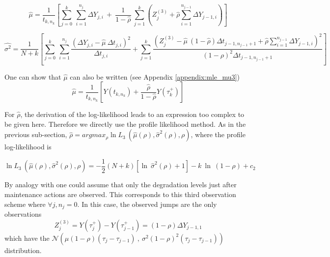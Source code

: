 \begin{equation}
\hat{\mu} = \frac{1}{t_{k,n_{k}}} \left[ \sum\limits_{j=0}^{k}\ \sum\limits_{i=1}^{n_j}\Delta Y_{j,i}\ +\ \frac{1}{1-\hat{\rho}}\ \sum\limits_{j=1}^{k} \left(Z_j^{(3)}+\hat{\rho} \sum \limits_{i=1}^{n_{j-1}}\Delta Y_{j-1,i}\right)\right]
\label{eq:mle_mu3}
\end{equation}


\begin{equation}
\hat{\sigma^2} =\frac{1}{N+k} \left[\sum\limits_{j=0}^{k}\ \sum\limits_{i=1}^{n_j} \frac{(\Delta Y_{j,i}-\hat{\mu}\ \Delta t_{j,i})^2}{\Delta t_{j,i}}
+ \sum\limits_{j=1}^{k} \frac{\left(Z_j^{(3)}-\hat{\mu}\ (1-\hat{\rho})\Delta t_{j-1,n_{j-1}+1}+\hat{\rho} \sum \limits_{i=1}^{n_{j-1}}\Delta Y_{j-1,i}\right)^2}{(1-\rho)^2 \Delta t_{j-1,n_{j-1}+1}}\right]
\end{equation}

\noindent One can show that $\hat\mu$ can also be written (see Appendix \ref{appendix:mle_mu3})
$$ \hat\mu=\frac{1}{t_{k,n_k}} \left[Y(t_{k,n_k})+\frac{\hat\rho}{1-\hat\rho}Y(\tau_k^+)\right]$$

For $\hat{\rho}$, the derivation of the log-likelihood leads to an expression too complex to be given here. Therefore we directly use the profile likelihood method.
As in the previous sub-section, $\hat\rho=argmax_{\rho} \ln L_3\ (\hat{\mu}(\rho),\hat{\sigma}^2(\rho),\rho)$, where the profile log-likelihood is 

\begin{equation}
\ln L_3\ (\hat{\mu}(\rho),\hat{\sigma}^2(\rho),\rho) = -\frac{1}{2} (N+k) \left[ \ln\ \hat{\sigma}^2(\rho) +1 \right]- k\ \ln\ (1-\rho) + c_2 
\end{equation}

\vspace{3 mm}

By analogy with \cite{salles_semiparametric_2020, kamranfar_inference_2021} one could assume that only the degradation levels just after maintenance actions are observed. This corresponds to this third observation scheme where $\forall j, n_j=0$.
In this case, the observed jumps are the only observations 
$$Z_j^{(3)} = Y(\tau_j^+) - Y(\tau_{j-1}^+) = (1-\rho) \Delta Y_{j-1,1}$$
\label{eq:logp3}
\noindent which have the $\mathcal{N}\left(\mu (1-\rho) (\tau_j - \tau_{j-1})\ ,\ \sigma^2 (1-\rho)^2 (\tau_j - \tau_{j-1})\right)$ distribution.

